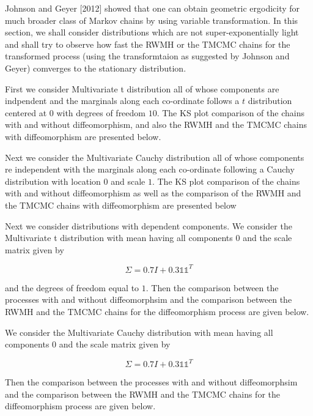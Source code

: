 \documentclass[11pt, DIV10,a4paper]{article}
\begin{document}
Johnson and Geyer [2012] showed that one can obtain geometric ergodicity for much broader class of Markov chains by using variable transformation. In this section, we shall consider distributions which are not super-exponentially  light and shall try to observe how fast the RWMH or the TMCMC chains for the transformed process (using the transformtaion as suggested by Johnson and Geyer) comverges to the stationary distribution.

First we consider Multivariate t distribution all of whose components are indpendent and the marginals along each co-ordinate follows a $t$ distribution centered at $0$ with degrees of freedom $10$. The KS plot comparison of the chains with and without diffeomorphism, and also the RWMH and the TMCMC chains with diffeomorphism are presented below. 


Next we consider the Multivariate Cauchy distribution all of whose components re independent with the marginals along each co-ordinate following  a Cauchy distribution with location $0$ and scale $1$.  The KS plot comparison of the chains with and without diffeomorphism as well as the comparison of the RWMH and the TMCMC chains with diffeomorphism are presented below


Next we consider distributions with dependent components. We consider the Multivariate t distribution with mean having all components $0$ and the scale matrix given by 

$$  \Sigma  = 0.7 I + 0.3 \mathbb{1} \mathbb{1}^{T}  $$

and the degrees of freedom equal to $1$. Then the comparison between the processes with and without diffeomorphsim and the comparison between the RWMH and the TMCMC chains for the diffeomorphism process are given below.



We consider the Multivariate Cauchy distribution with mean having all components $0$ and the scale matrix given by 

$$  \Sigma  = 0.7 I + 0.3 \mathbb{1} \mathbb{1}^{T}  $$

Then the comparison between the processes with and without diffeomorphsim and the comparison between the RWMH and the TMCMC chains for the diffeomorphism process are given below.

\end{document}
